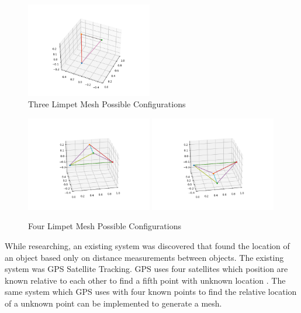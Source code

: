 \begin{figure}[H]
	\centering
	\noindent\includegraphics[width=0.49\textwidth]{images/3LimpetNet}
	\caption{Three Limpet Mesh Possible Configurations}
	\label{fig:3PMesh}
\end{figure}

\begin{figure}[H]
	\centering
	\noindent\includegraphics[width=0.49\textwidth]{images/4LimpetNet}
	\noindent\includegraphics[width=0.49\textwidth]{images/4LimpetNetFlip}
	\caption{Four Limpet Mesh Possible Configurations}
	\label{fig:4PMesh}
\end{figure}

While researching, an existing system was discovered that found the location of an object based only on distance measurements between objects. The existing system was GPS Satellite Tracking. GPS uses four satellites which position are known relative to each other to find a fifth point with unknown location \cite{gps}. The same system which GPS uses with four known points to find the relative location of a unknown point can be implemented to generate a mesh.
